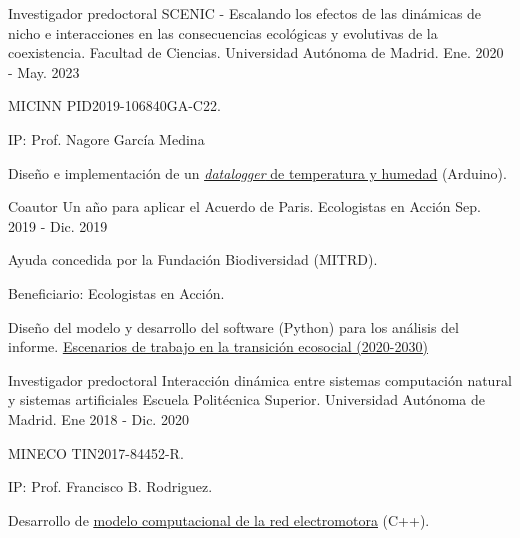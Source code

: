 \begin{cventries}
  \cventry
    {Investigador predoctoral} %
    {SCENIC - Escalando los efectos de las dinámicas de nicho e interacciones en las consecuencias ecológicas y evolutivas de la coexistencia.} %
    {Facultad de Ciencias. Universidad Autónoma de Madrid.} %
    {Ene. 2020 - May. 2023} %
    {
      \begin{cvitems} %
        \item {MICINN PID2019-106840GA-C22.}
        \item {IP: Prof. Nagore García Medina}
        \item {Diseño e implementación de un \underline{\href{https://github.com/united-ecology/btmboard}{\textit{datalogger} de temperatura y humedad}} (Arduino).}
      \end{cvitems}
    }

  \cventry %
    {Coautor} %
    {Un año para aplicar el Acuerdo de Paris.} %
    {Ecologistas en Acción} %
    {Sep. 2019 - Dic. 2019} %
    {
      \begin{cvitems} %
      	\item {Ayuda concedida por la Fundación Biodiversidad (MITRD).}
        \item {Beneficiario: Ecologistas en Acción.}
        \item {Diseño del modelo y desarrollo del software (Python) para los análisis del informe. \underline{\href{https://www.ecologistasenaccion.org/132893/informe-escenarios-de-trabajo-en-la-transicion-ecosocial-2020-2030/}{Escenarios de trabajo en la transición ecosocial (2020-2030)}} }
      \end{cvitems}
    }

  \cventry
    {Investigador predoctoral} %
    {Interacción dinámica entre sistemas computación natural y sistemas artificiales} %
    {Escuela Politécnica Superior. Universidad Autónoma de Madrid.} %
    {Ene 2018 - Dic.  2020} %
    {
      \begin{cvitems} %
        \item {MINECO TIN2017-84452-R.}
        \item {IP: Prof. Francisco B. Rodriguez.}
        \item {Desarrollo de \underline{\href{https://github.com/GNB-UAM/electromotor-nmodel}{modelo computacional de la red electromotora}} (C++).}
      \end{cvitems}
    }
    

\end{cventries}
